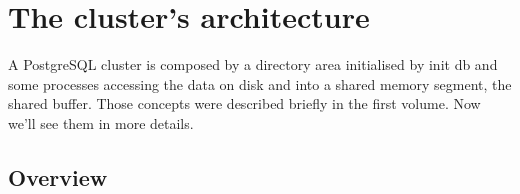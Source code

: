 \chapter{The cluster's architecture}
A PostgreSQL cluster is composed by a directory area initialised by init db and some processes 
accessing the data on disk and into a shared memory segment, the shared buffer. Those concepts were 
described briefly in the first volume. Now we'll see them in more details.

\section{Overview}


